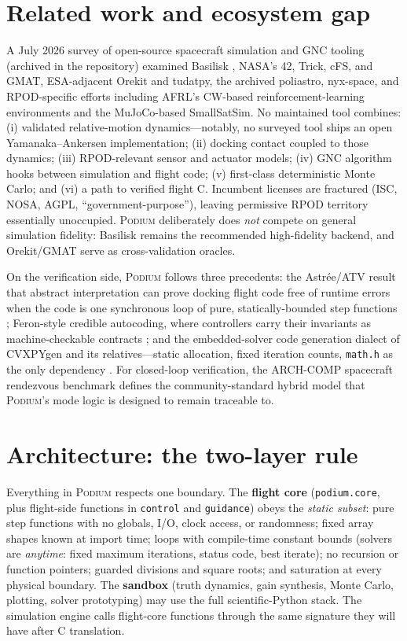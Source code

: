 \documentclass[11pt]{article}
\newcommand{\podium}{\textsc{Podium}}
\begin{document}
\section{Related work and ecosystem gap}
\label{sec:related}

A July 2026 survey of open-source spacecraft simulation and GNC tooling
(archived in the repository) examined Basilisk \cite{schulte2020basilisk},
NASA's 42, Trick, cFS, and GMAT, ESA-adjacent Orekit and tudatpy, the
archived poliastro, nyx-space, and RPOD-specific efforts including AFRL's
CW-based reinforcement-learning environments and the MuJoCo-based
SmallSatSim. No maintained tool combines: (i) validated relative-motion
dynamics---notably, no surveyed tool ships an open Yamanaka--Ankersen
implementation; (ii) docking contact coupled to those dynamics; (iii)
RPOD-relevant sensor and actuator models; (iv) GNC algorithm hooks between
simulation and flight code; (v) first-class deterministic Monte Carlo; and
(vi) a path to verified flight C. Incumbent licenses are fractured
(ISC, NOSA, AGPL, ``government-purpose''), leaving permissive RPOD territory
essentially unoccupied. \podium{} deliberately does \emph{not} compete on
general simulation fidelity: Basilisk remains the recommended high-fidelity
backend, and Orekit/GMAT serve as cross-validation oracles.

On the verification side, \podium{} follows three precedents: the
Astr\'ee/ATV result that abstract interpretation can prove docking flight
code free of runtime errors when the code is one synchronous loop of pure,
statically-bounded step functions \cite{kastner2010}; Feron-style credible
autocoding, where controllers carry their invariants as machine-checkable
contracts \cite{feron2013}; and the embedded-solver code generation dialect
of CVXPYgen and its relatives---static allocation, fixed iteration counts,
\texttt{math.h} as the only dependency \cite{cvxpygen2022}. For closed-loop
verification, the ARCH-COMP spacecraft rendezvous benchmark
\cite{chan2017} defines the community-standard hybrid model that
\podium{}'s mode logic is designed to remain traceable to.

\section{Architecture: the two-layer rule}
\label{sec:arch}

Everything in \podium{} respects one boundary. The \textbf{flight core}
(\texttt{podium.core}, plus flight-side functions in \texttt{control} and
\texttt{guidance}) obeys the \emph{static subset}: pure step functions with
no globals, I/O, clock access, or randomness; fixed array shapes known at
import time; loops with compile-time constant bounds (solvers are
\emph{anytime}: fixed maximum iterations, status code, best iterate); no
recursion or function pointers; guarded divisions and square roots; and
saturation at every physical boundary. The \textbf{sandbox} (truth dynamics,
gain synthesis, Monte Carlo, plotting, solver prototyping) may use the full
scientific-Python stack. The simulation engine calls flight-core functions
through the same signature they will have after C translation.
\end{document}
